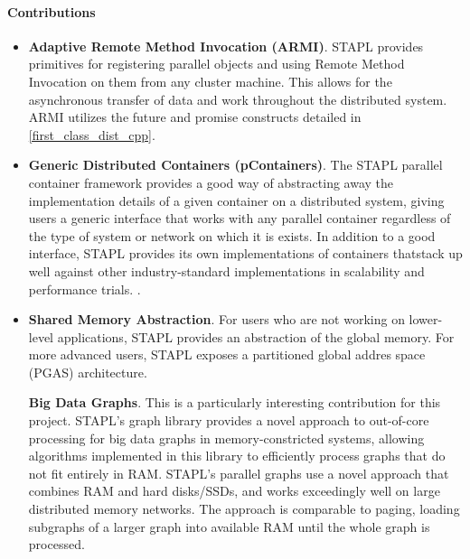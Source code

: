 \paragraph{Contributions} 
\begin{itemize}
	\item
		\textbf{Adaptive Remote Method Invocation (ARMI)}. STAPL provides primitives for registering parallel objects and using Remote Method Invocation on them from any cluster machine. This allows for the asynchronous transfer of data and work throughout the distributed system.  ARMI utilizes the future and promise constructs detailed in \ref{first_class_dist_cpp}. 
	\item
		\textbf{Generic Distributed Containers (pContainers)}. The STAPL parallel container framework provides a good way of abstracting away the implementation details of a given container on a distributed system, giving users a generic interface that works with any parallel container regardless of the type of system or network on which it is exists. In addition to a good interface, STAPL provides its own implementations of containers thatstack up well against other industry-standard implementations in scalability and performance trials. \cite{stapl_parallel_container}.	
	\item
		\textbf{Shared Memory Abstraction}. For users who are not working on lower-level applications, STAPL provides an abstraction of the global memory. For more advanced users, STAPL exposes a partitioned global addres space (PGAS) architecture. 

		\textbf{Big Data Graphs}. This is a particularly interesting contribution for this project. STAPL's graph library \cite{stapl_graph} provides a novel approach to out-of-core processing for big data graphs in memory-constricted systems, allowing algorithms implemented in this library to efficiently process graphs that do not fit entirely in RAM. STAPL's parallel graphs use a novel approach that combines RAM and hard disks/SSDs, and works exceedingly well on large distributed memory networks. The approach is comparable to paging, loading subgraphs of a larger graph into available RAM until the whole graph is processed. 
\end{itemize}

